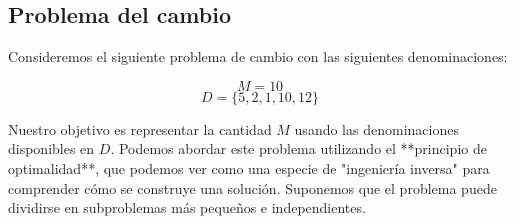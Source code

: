 




\subsection{Problema del cambio}

Consideremos el siguiente problema de cambio con las siguientes denominaciones:

$$
	M = 10
$$
$$
	D = \{5, 2, 1, 10, 12\}
$$

Nuestro objetivo es representar la cantidad $M$ usando las denominaciones disponibles en $D$. Podemos abordar este problema utilizando el **principio de optimalidad**, que podemos ver como una especie de "ingeniería inversa" para comprender cómo se construye una solución. Suponemos que el problema puede dividirse en subproblemas más pequeños e independientes.

